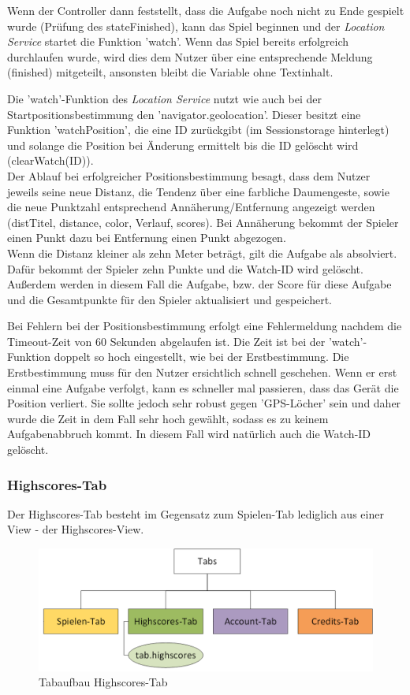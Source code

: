 Wenn der Controller dann feststellt, dass die Aufgabe noch nicht zu Ende gespielt wurde (Prüfung des stateFinished), kann das Spiel beginnen und der \emph{Location Service} startet die Funktion 'watch'. Wenn das Spiel bereits erfolgreich durchlaufen wurde, wird dies dem Nutzer über eine entsprechende Meldung (finished) mitgeteilt, ansonsten bleibt die Variable ohne Textinhalt.


Die 'watch'-Funktion des \emph{Location Service} nutzt wie auch bei der Startpositionsbestimmung den 'navigator.geolocation'. Dieser besitzt eine Funktion 'watchPosition', die eine ID zurückgibt (im Sessionstorage hinterlegt) und solange die Position bei Änderung ermittelt bis die ID gelöscht wird (clearWatch(ID)).
\\
Der Ablauf bei erfolgreicher Positionsbestimmung besagt, dass dem Nutzer jeweils seine neue Distanz, die Tendenz über eine farbliche Daumengeste, sowie die neue Punktzahl entsprechend Annäherung/Entfernung angezeigt werden (distTitel, distance, color, Verlauf, scores). Bei Annäherung bekommt der Spieler einen Punkt dazu bei Entfernung einen Punkt abgezogen.
\\
Wenn die Distanz kleiner als zehn Meter beträgt, gilt die Aufgabe als absolviert. Dafür bekommt der Spieler zehn Punkte und die Watch-ID wird gelöscht. Außerdem werden in diesem Fall die Aufgabe, bzw. der Score für diese Aufgabe und die Gesamtpunkte für den Spieler aktualisiert und gespeichert.


Bei Fehlern bei der Positionsbestimmung erfolgt eine Fehlermeldung nachdem die Timeout-Zeit von 60 Sekunden abgelaufen ist. Die Zeit ist bei der 'watch'-Funktion doppelt so hoch eingestellt, wie bei der Erstbestimmung. Die Erstbestimmung muss für den Nutzer ersichtlich schnell geschehen. Wenn er erst einmal eine Aufgabe verfolgt, kann es schneller mal passieren, dass das Gerät die Position verliert. Sie sollte jedoch sehr robust gegen 'GPS-Löcher' sein und daher wurde die Zeit in dem Fall sehr hoch gewählt, sodass es zu keinem Aufgabenabbruch kommt. In diesem Fall wird natürlich auch die Watch-ID gelöscht.
\subsubsection{Highscores-Tab}
Der Highscores-Tab besteht im Gegensatz zum Spielen-Tab lediglich aus einer View - der Highscores-View.
\begin{figure}[h]
\centering
\includegraphics[width=1\textwidth]{ref/images/tabs_highscores.png}
\caption[Tabaufbau Highscores-Tab]{Tabaufbau Highscores-Tab}
\label{fig:Tabaufbau Highscores-Tab}
\end{figure}


